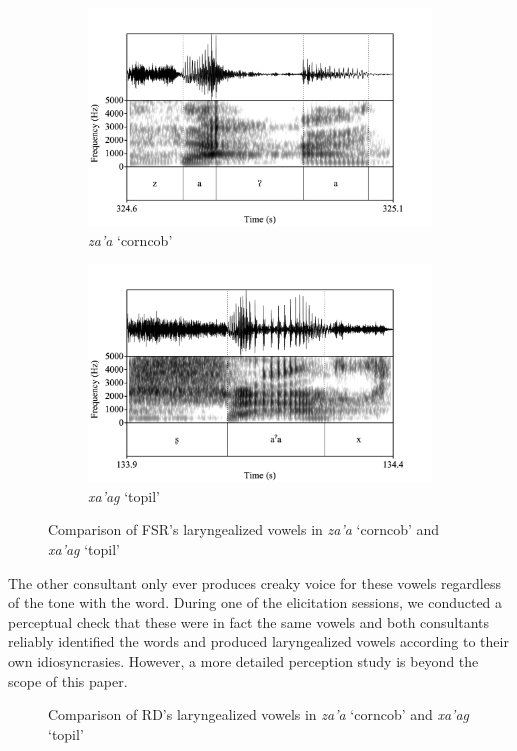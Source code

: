 \documentclass[12pt, letterpaper]{article}
\begin{document}
\begin{figure}[!h]
	\centering
	\begin{subfigure}{.5\textwidth}
		\centering
		\includegraphics[width=\linewidth]{../za'a.png}
		\caption{\textit{za'a} `corncob'}
		\label{fig:za'a}
	\end{subfigure}%
	\begin{subfigure}{.5\textwidth}
		\centering
		\includegraphics[width=\linewidth]{../xa'ag.png}
		\caption{\textit{xa'ag} `topil'}
		\label{fig:xa'ag}
	\end{subfigure}	
	\caption{Comparison of FSR's laryngealized vowels in \textit{za'a} `corncob' and \textit{xa'ag} `topil'}
	\label{fig:FSRLaryngeal}
\end{figure}

The other consultant only ever produces creaky voice for these vowels regardless of the tone with the word. During one of the elicitation sessions, we conducted a perceptual check that these were in fact the same vowels and both consultants reliably identified the words and produced laryngealized vowels according to their own idiosyncrasies. However, a more detailed perception study is beyond the scope of this paper. 
\begin{figure}[!h]

	\caption{Comparison of RD's laryngealized vowels in \textit{za'a} `corncob' and \textit{xa'ag} `topil'}
	\label{fig:RDLaryngeal}
\end{figure}
\end{document}
